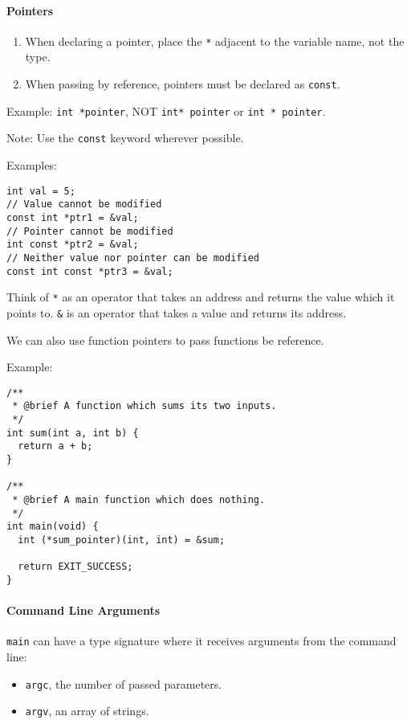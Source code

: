 \documentclass[twocolumn,english]{article}
\begin{document}
\paragraph{Pointers}\label{pointers}

\begin{enumerate}
\def\labelenumi{\arabic{enumi}.}

\item
  When declaring a pointer, place the \texttt{*} adjacent to the
  variable name, not the type.
\item
  When passing by reference, pointers must be declared as
  \texttt{const}.
\end{enumerate}

Example: \texttt{int\ *pointer}, NOT \texttt{int*\ pointer} or
\texttt{int\ *\ pointer}.

Note: Use the \texttt{const} keyword wherever possible.

Examples:

\begin{verbatim}
int val = 5;
// Value cannot be modified
const int *ptr1 = &val;
// Pointer cannot be modified
int const *ptr2 = &val;
// Neither value nor pointer can be modified
const int const *ptr3 = &val;
\end{verbatim}

Think of \texttt{*} as an operator that takes an address and returns the
value which it points to. \texttt{\&} is an operator that takes a value
and returns its address.

We can also use function pointers to pass functions be reference.

Example:

\begin{verbatim}
/**
 * @brief A function which sums its two inputs.
 */
int sum(int a, int b) {
  return a + b;
}

/**
 * @brief A main function which does nothing.
 */
int main(void) {
  int (*sum_pointer)(int, int) = &sum;

  return EXIT_SUCCESS;
}
\end{verbatim}

\paragraph{Command Line Arguments}\label{command-line-arguments}

\texttt{main} can have a type signature where it receives arguments from
the command line:

\begin{itemize}

\item
  \texttt{argc}, the number of passed parameters.
\item
  \texttt{argv}, an array of strings.
\end{itemize}
\end{document}
